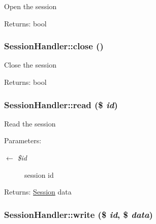 Open the session

\begin{Desc}
\item[Returns:]bool \end{Desc}
\hypertarget{classSessionHandler_335ced83731c7e3e685b7e0df2989c79}{
\subsubsection{\setlength{\rightskip}{0pt plus 5cm}SessionHandler::close ()}}
\label{classSessionHandler_335ced83731c7e3e685b7e0df2989c79}


Close the session

\begin{Desc}
\item[Returns:]bool \end{Desc}
\hypertarget{classSessionHandler_58cc3e5bf5b14e7bfbc73162de1f5d2b}{
\subsubsection{\setlength{\rightskip}{0pt plus 5cm}SessionHandler::read (\$ {\em id})}}
\label{classSessionHandler_58cc3e5bf5b14e7bfbc73162de1f5d2b}


Read the session

\begin{Desc}
\item[Parameters:]
\begin{description}
\item[\mbox{$\leftarrow$} {\em \$id}]session id \end{description}
\end{Desc}
\begin{Desc}
\item[Returns:]\hyperlink{classSession}{Session} data \end{Desc}
\hypertarget{classSessionHandler_b59071ef0d3deee2472c6916471bd9f5}{
\subsubsection{\setlength{\rightskip}{0pt plus 5cm}SessionHandler::write (\$ {\em id}, \$ {\em data})}}
\label{classSessionHandler_b59071ef0d3deee2472c6916471bd9f5}


